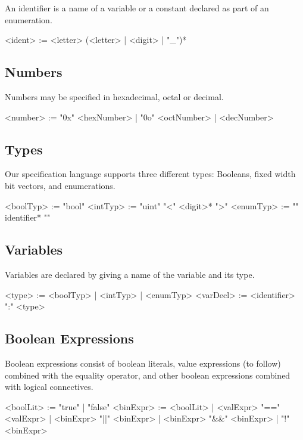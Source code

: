 An identifier is a name of a variable or a constant declared as part of an enumeration.

\begin{bnflisting}
    <ident>    := <letter> (<letter> | <digit> | "_")*
\end{bnflisting}

\subsection{Numbers}

Numbers may be specified in hexadecimal, octal or decimal.

\begin{bnflisting}
    <number>    := "0x" <hexNumber>
                 | "0o" <octNumber>
                 | <decNumber>
\end{bnflisting}

\subsection{Types}

Our specification language supports three different types: Booleans, fixed width bit vectors, and enumerations.

\begin{bnflisting}
    <boolTyp>  := "bool"
    <intTyp>   := "uint" "<" <digit>* ">"
    <enumTyp>  := "{" identifier* "}"
\end{bnflisting}

\subsection{Variables}

Variables are declared by giving a name of the variable and its type.

\begin{bnflisting}
    <type>     := <boolTyp> | <intTyp> | <enumTyp>
    <varDecl>  := <identifier> ":" <type>
\end{bnflisting}

\subsection{Boolean Expressions}

Boolean expressions consist of boolean literals, value expressions (to follow) combined with the equality operator, and other boolean expressions combined with logical connectives.

\begin{bnflisting}
    <boolLit>  := "true" | "false"
    <binExpr>  := <boolLit> 
                | <valExpr> "==" <valExpr> 
                | <binExpr> "||" <binExpr> 
                | <binExpr> "&&" <binExpr> 
                | "!" <binExpr>
\end{bnflisting}

